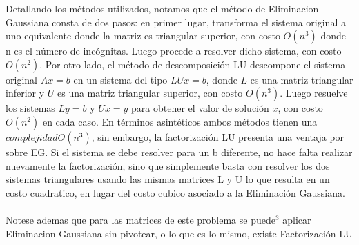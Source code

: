 Detallando los m\'etodos utilizados, notamos que el m\'etodo de Eliminacion Gaussiana consta de dos pasos: en primer
lugar, transforma el sistema original a uno equivalente donde la matriz es triangular
superior, con costo $O(n^3)$ donde n es el n\'umero de inc\'ognitas. Luego procede a resolver dicho
sistema, con costo $O(n^2)$. Por otro lado, el m\'etodo de descomposici\'on LU descompone el sistema original
$Ax = b$ en un sistema del tipo $LUx = b$, donde $L$ es una matriz triangular inferior y $U$ es una matriz
triangular superior, con costo $O(n^3)$. Luego resuelve los sistemas $Ly = b$ y
$Ux = y$ para obtener el valor de soluci\'on $x$, con costo $O(n^2)$ en cada caso. 
En t\'erminos asint\'eticos ambos m\'etodos tienen una $complejidad O(n^3)$, sin embargo, la factorizaci\'on LU presenta 
una ventaja por sobre EG. Si el sistema se debe resolver para un b diferente, no hace falta realizar nuevamente la factorizaci\'on,
sino que simplemente basta con resolver los dos sistemas triangulares usando las mismas matrices L y
U lo que resulta en un costo cuadratico, en lugar del costo cubico asociado a la Eliminaci\'on Gaussiana. \\\\

Notese ademas que para las matrices de este problema se puede$^3$ aplicar Eliminacion Gaussiana sin pivotear, o lo que es lo mismo, existe Factorizaci\'on LU

